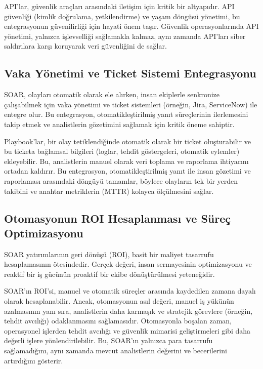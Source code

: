 API'lar, güvenlik araçları arasındaki iletişim için kritik bir altyapıdır. API güvenliği (kimlik doğrulama, yetkilendirme) ve yaşam döngüsü yönetimi, bu entegrasyonun güvenilirliği için hayati önem taşır. Güvenlik operasyonlarında API yönetimi, yalnızca işlevselliği sağlamakla kalmaz, aynı zamanda API'ları siber saldırılara karşı koruyarak veri güvenliğini de sağlar.

\subsection{Vaka Yönetimi ve Ticket Sistemi Entegrasyonu}

SOAR, olayları otomatik olarak ele alırken, insan ekiplerle senkronize çalışabilmek için vaka yönetimi ve ticket sistemleri (örneğin, Jira, ServiceNow) ile entegre olur. Bu entegrasyon, otomatikleştirilmiş yanıt süreçlerinin ilerlemesini takip etmek ve analistlerin gözetimini sağlamak için kritik öneme sahiptir.

Playbook'lar, bir olay tetiklendiğinde otomatik olarak bir ticket oluşturabilir ve bu ticketa bağlamsal bilgileri (loglar, tehdit göstergeleri, otomatik eylemler) ekleyebilir. Bu, analistlerin manuel olarak veri toplama ve raporlama ihtiyacını ortadan kaldırır. Bu entegrasyon, otomatikleştirilmiş yanıt ile insan gözetimi ve raporlaması arasındaki döngüyü tamamlar, böylece olayların tek bir yerden takibini ve anahtar metriklerin (MTTR) kolayca ölçülmesini sağlar.

\subsection{Otomasyonun ROI Hesaplanması ve Süreç Optimizasyonu}

SOAR yatırımlarının geri dönüşü (ROI), basit bir maliyet tasarrufu hesaplamasının ötesindedir. Gerçek değeri, insan sermayesinin optimizasyonu ve reaktif bir iş gücünün proaktif bir ekibe dönüştürülmesi yeteneğidir.

SOAR'ın ROI'si, manuel ve otomatik süreçler arasında kaydedilen zamana dayalı olarak hesaplanabilir. Ancak, otomasyonun asıl değeri, manuel iş yükünün azalmasının yanı sıra, analistlerin daha karmaşık ve stratejik görevlere (örneğin, tehdit avcılığı) odaklanmasını sağlamasıdır. Otomasyonla boşalan zaman, operasyonel işlerden tehdit avcılığı ve güvenlik mimarisi geliştirmeleri gibi daha değerli işlere yönlendirilebilir. Bu, SOAR'ın yalnızca para tasarrufu sağlamadığını, aynı zamanda mevcut analistlerin değerini ve becerilerini artırdığını gösterir.

